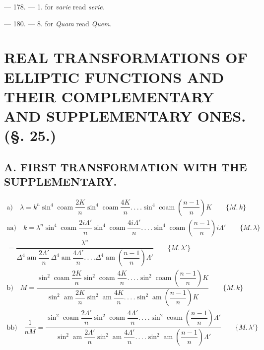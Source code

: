 \documentclass{article}
\begin{document}
--- 178. --- 1. for \emph{varie} read \emph{serie.}

--- 180. --- 8. for \emph{Quam} read \emph{Quem.}

\section*{REAL TRANSFORMATIONS OF ELLIPTIC FUNCTIONS AND THEIR COMPLEMENTARY AND SUPPLEMENTARY ONES. (§. 25.)}

\subsection*{A. FIRST TRANSFORMATION WITH THE SUPPLEMENTARY.}

\[
\begin{gathered}
\text{a)}\quad \lambda=k^{n}\sin^{4}\operatorname{coam}\dfrac{2K}{n}\sin^{4}\operatorname{coam}\dfrac{4K}{n}.\,.\,.\,.\sin^{4}\operatorname{coam}\left(\dfrac{n-1}{n}\right)K\qquad\{M.\,k\}\\[1.5ex]
\text{aa)}\quad k=\lambda^{n}\sin^{4}\operatorname{coam}\dfrac{2i\Lambda'}{n}\sin^{4}\operatorname{coam}\dfrac{4i\Lambda'}{n}.\,.\,.\,.\sin^{4}\operatorname{coam}\left(\dfrac{n-1}{n}\right)i\Lambda'\qquad\{M.\,\lambda\}\\[1.5ex]
{}=\dfrac{\lambda^{n}}{\Delta^{4}\operatorname{am}\dfrac{2\Lambda'}{n}\,\Delta^{4}\operatorname{am}\dfrac{4\Lambda'}{n}.\,.\,.\,.\Delta^{4}\operatorname{am}\left(\dfrac{n-1}{n}\right)\Lambda'}\qquad\{M.\,\lambda'\}\\[1.5ex]
\text{b)}\quad M=\dfrac{\sin^{2}\operatorname{coam}\dfrac{2K}{n}\sin^{2}\operatorname{coam}\dfrac{4K}{n}.\,.\,.\,.\sin^{2}\operatorname{coam}\left(\dfrac{n-1}{n}\right)K}{\sin^{2}\operatorname{am}\dfrac{2K}{n}\sin^{2}\operatorname{am}\dfrac{4K}{n}.\,.\,.\,.\sin^{2}\operatorname{am}\left(\dfrac{n-1}{n}\right)K}\qquad\{M.\,k\}\\[1.5ex]
\text{bb)}\quad \dfrac{1}{nM}=\dfrac{\sin^{2}\operatorname{coam}\dfrac{2\Lambda'}{n}\sin^{2}\operatorname{coam}\dfrac{4\Lambda'}{n}.\,.\,.\,.\sin^{2}\operatorname{coam}\left(\dfrac{n-1}{n}\right)\Lambda'}{\sin^{2}\operatorname{am}\dfrac{2\Lambda'}{n}\sin^{2}\operatorname{am}\dfrac{4\Lambda'}{n}.\,.\,.\,.\sin^{2}\operatorname{am}\left(\dfrac{n-1}{n}\right)\Lambda'}\qquad\{M.\,\lambda'\}
\end{gathered}
\]
\end{document}
